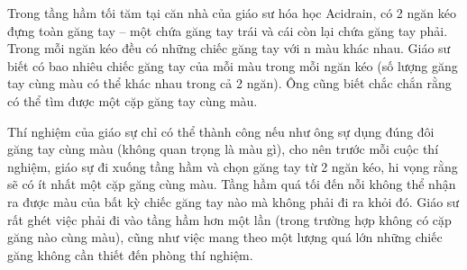 Trong tầng hầm tối tăm tại căn nhà của giáo sư hóa học Acidrain, có 2 ngăn kéo đựng toàn găng tay – một chứa găng tay trái và cái còn lại chứa găng tay phải. Trong mỗi ngăn kéo đều có những chiếc găng tay với n màu khác nhau. Giáo sư biết có bao nhiêu chiếc găng tay của mỗi màu trong mỗi ngăn kéo (số lượng găng tay cùng màu có thể khác nhau trong cả 2 ngăn). Ông cũng biết chắc chắn rằng có thể tìm được một cặp găng tay cùng màu.  

   Thí nghiệm của giáo sự chỉ có thể thành công nếu như ông sự dụng đúng đôi găng tay cùng màu (không quan trọng là màu gì), cho nên trước mỗi cuộc thí nghiệm, giáo sự đi xuống tầng hầm và chọn găng tay từ 2 ngăn kéo, hi vọng rằng sẽ có ít nhất một cặp găng cùng màu. Tầng hầm quá tối đến nỗi không thể nhận ra được màu của bất kỳ chiếc găng tay nào mà không phải đi ra khỏi đó. Giáo sư rất ghét việc phải đi vào tầng hầm hơn một lần (trong trường hợp không có cặp găng nào cùng màu), cũng như việc mang theo một lượng quá lớn những chiếc găng không cần thiết đến phòng thí nghiệm.